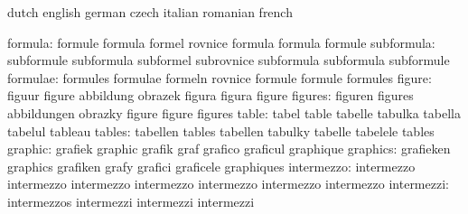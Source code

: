 
\startvariables            dutch                     english
                           german                    czech
                           italian                   romanian
                           french

                  formula: formule                   formula
                           formel                    rovnice
                           formula                   formula
                           formule
               subformula: subformule                subformula
                           subformel                 subrovnice
                           subformula                subformula
                           subformule
                 formulae: formules                  formulae
                           formeln                   rovnice
                           formule                   formule
                           formules
                   figure: figuur                    figure
                           abbildung                 obrazek
                           figura                    figura
                           figure
                  figures: figuren                   figures
                           abbildungen               obrazky
                           figure                    figure
                           figures
                    table: tabel                     table
                           tabelle                   tabulka
                           tabella                   tabelul
                           tableau
                   tables: tabellen                  tables
                           tabellen                  tabulky
                           tabelle                   tabelele
                           tables
                  graphic: grafiek                   graphic
                           grafik                    graf
                           grafico                   graficul
                           graphique
                 graphics: grafieken                 graphics
                           grafiken                  grafy
                           grafici                   graficele
                           graphiques
               intermezzo: intermezzo                intermezzo
                           intermezzo                intermezzo
                           intermezzo                intermezzo
                           intermezzo
               intermezzi: intermezzos               intermezzi
                           intermezzi                intermezzi
